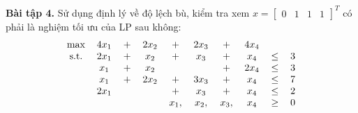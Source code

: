 \documentclass[12pt]{article}
\begin{document}
    \textbf{Bài tập 4.} Sử dụng định lý về độ lệch bù, kiểm tra xem $x = \begin{bmatrix} 0 & 1 & 1 & 1 \end{bmatrix}^T$ có phải là nghiệm tối ưu của LP sau không:
    \begin{align*}
        \begin{tabular}{cccccccccc}
            \text{max} & $4x_1$ & $+$ & $2x_2$ & $+$ & $2x_3$ & $+$ & $4x_4$ \\
            \text{s.t.} & $2x_1$ & $+$ & $x_2$ & $+$ & $x_3$ & $+$ & $x_4$ & $\leq$ & 3 \\
            & $x_1$ & $+$ & $x_2$ & & & $+$ & $2x_4$ & $\leq$ & 3 \\
            & $x_1$ & $+$ & $2x_2$ & $+$ & $3x_3$ & $+$ & $x_4$ & $\leq$ & 7 \\
            & $2x_1$ & & & $+$ & $x_3$ & $+$ & $x_4$ & $\leq$ & 2\\
            & & & & $x_1,$ & $x_2,$ & $x_3,$ & $x_4$ & $\geq$ & 0
        \end{tabular}
    \end{align*}
\end{document}
